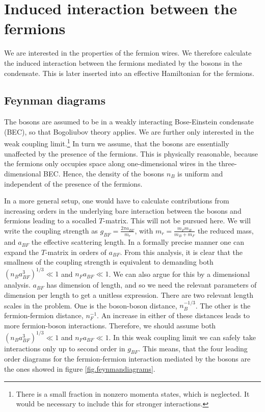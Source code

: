 \section{Induced interaction between the fermions} \label{sec.1D3Dinducedinteraction}
We are interested in the properties of the fermion wires. We therefore calculate the induced interaction between the fermions mediated by the bosons in the condensate. This is later inserted into an effective Hamiltonian for the fermions. 

\subsection{Feynman diagrams} \label{subsec.Feynmandiagrams}
The bosons are assumed to be in a weakly interacting Bose-Einstein condensate (BEC), so that Bogoliubov theory applies. We are further only interested in the weak coupling limit.\footnote{There is a small fraction in nonzero momenta states, which is neglected. It would be necessary to include this for stronger interactions.} In turn we assume, that the bosons are essentially unaffected by the presence of the fermions. This is physically reasonable, because the fermions only occupies space along one-dimensional wires in the three-dimensional BEC. Hence, the density of the bosons $n_B$ is uniform and independent of the presence of the fermions. 

In a more general setup, one would have to calculate contributions from increasing orders in the underlying bare interaction between the bosons and fermions leading to a socalled $T$-matrix. This will not be pursued here. We will write the coupling strength as $g_{BF} = \frac{2\pi a_{BF}}{m_r}$, with $m_r = \frac{m_Fm_B}{m_B + m_F}$ the reduced mass, and $a_{BF}$ the effective scattering length. In a formally precise manner one can expand the $T$-matrix in orders of $a_{BF}$. From this analysis, it is clear that the smallness of the coupling strength is equivalent to demanding both $(n_Ba_{BF}^3)^{1/3}\ll 1$ and $n_Fa_{BF} \ll 1$. We can also argue for this by a dimensional analysis. $a_{BF}$ has dimension of length, and so we need the relevant parameters of dimension per length to get a unitless expression. There are two relevant length scales in the problem. One is the boson-boson distance, $n_B^{-1/3}$. The other is the fermion-fermion distance, $n_F^{-1}$. An increase in either of these distances leads to more fermion-boson interactions. Therefore, we should assume both $(n_Ba_{BF}^3)^{1/3} \ll 1$ and $n_Fa_{BF}\ll 1$. In this weak coupling limit we can safely take interactions only up to second order in $g_{BF}$. This means, that the four leading order diagrams for the fermion-fermion interaction mediated by the bosons are the ones showed in figure \ref{fig.feynmandiagrams}. 

